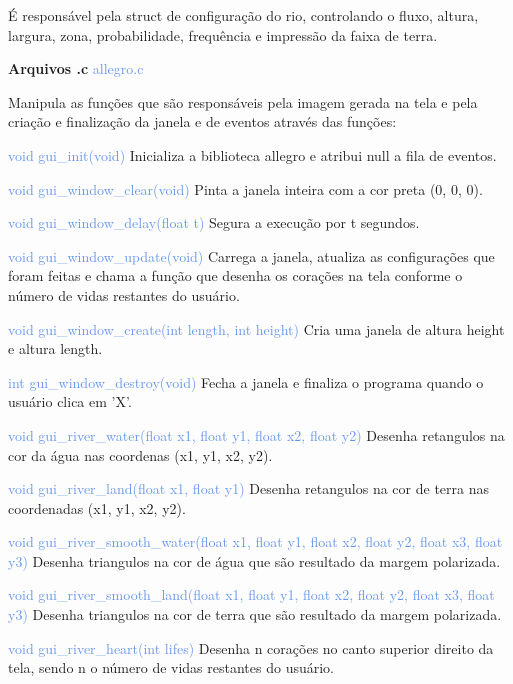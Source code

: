 \documentclass[a4paper,12pt]{article}
\begin{document}
É responsável pela struct de configuração do rio, controlando o fluxo, altura, largura, zona, probabilidade, frequência e impressão
da faixa de terra.


\newpage %

{\Large \textcolor{NavyBlue}{ \textbf{Arquivos .c  }}}{\large \textcolor{CornflowerBlue}{  allegro.c}}
\bigskip

Manipula as funções que são responsáveis pela imagem gerada na tela e pela criação e finalização da janela e de eventos através
das funções:

{\textcolor{CornflowerBlue}{void gui\_init(void)}} Inicializa a biblioteca allegro e atribui null a fila de eventos. 

{\textcolor{CornflowerBlue}{void gui\_window\_clear(void)}} Pinta a janela inteira com a cor preta (0, 0, 0).  

{\textcolor{CornflowerBlue}{void gui\_window\_delay(float t)}} Segura a execução por t segundos.

{\textcolor{CornflowerBlue}{void gui\_window\_update(void)}} Carrega a janela, atualiza as configurações que 
foram feitas e chama a função que desenha os corações na tela conforme o número de vidas restantes do usuário. 
 
{\textcolor{CornflowerBlue}{void gui\_window\_create(int length, int height)}} Cria uma janela de altura height e altura length. 

{\textcolor{CornflowerBlue}{int gui\_window\_destroy(void)}} Fecha a janela e finaliza o programa quando o usuário clica em 'X'.




{\textcolor{CornflowerBlue}{void gui\_river\_water(float x1, float y1, float x2, float y2)}} Desenha retangulos na cor da água nas 
coordenas (x1, y1, x2, y2).

{\textcolor{CornflowerBlue}{void gui\_river\_land(float x1, float y1)}} Desenha retangulos na cor de terra nas
coordenadas (x1, y1, x2, y2). 

{\textcolor{CornflowerBlue}{void gui\_river\_smooth\_water(float x1, float y1, float x2, float y2, float x3, float y3)}} Desenha triangulos na cor de água que são resultado da margem polarizada.

{\textcolor{CornflowerBlue}{void gui\_river\_smooth\_land(float x1, float y1, float x2, float y2, float x3, float y3)}} Desenha triangulos na cor de terra que são resultado da margem polarizada.

{\textcolor{CornflowerBlue}{void gui\_river\_heart(int lifes)}} Desenha n corações no canto superior direito 
da tela, sendo n o número de vidas restantes do usuário.
\end{document}
